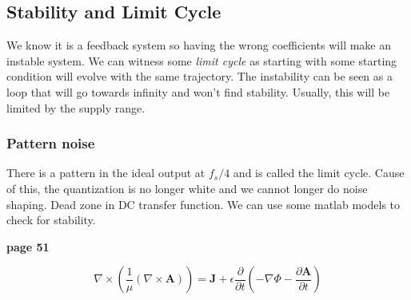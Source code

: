 \documentclass{report}
\begin{document}
\subsection{Stability and Limit Cycle}

We know it is a feedback system so having the wrong coefficients will make an instable system. We can witness some \textit{limit cycle} as starting with some starting condition will evolve with the same trajectory. The instability can be seen as a loop that will go towards infinity and won't find stability. Usually, this will be limited by the supply range.

\subsubsection{Pattern noise}

There is a pattern in the ideal output at $f_s / 4$ and is called the limit cycle. Cause of this, the quantization is no longer white and we cannot longer do noise shaping. Dead zone in DC transfer function. We can use some matlab models to check for stability.

\textbf{page 51}



$$\nabla \times \left( \frac{1}{\mu} (\nabla \times \mathbf{A}) \right) = \mathbf{J} + \epsilon \frac{\partial}{\partial t} \left( -\nabla \Phi - \frac{\partial \mathbf{A}}{\partial t} \right)$$


\printglossary[type=\acronymtype]
\end{document}
